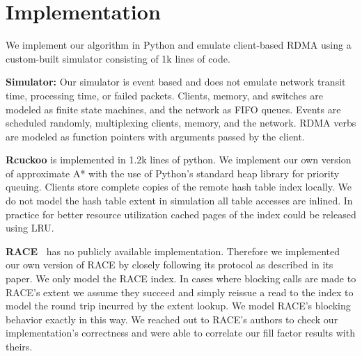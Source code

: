 \section{Implementation}

We implement our algorithm in
Python and emulate client-based RDMA using a custom-built
simulator consisting of 1k lines of code. 

\textbf{Simulator:} Our simulator is event based and does
not emulate network transit time, processing time, or failed
packets. Clients, memory, and switches are modeled as finite
state machines, and the network as FIFO queues. Events are
scheduled randomly, multiplexing clients, memory, and the
network. RDMA verbs are modeled as function pointers with
arguments passed by the client.

\textbf{Rcuckoo} is implemented in 1.2k lines of
python. We implement our own version of approximate A* with
the use of Python's standard heap library for priority
queuing. Clients store complete copies of the remote hash
table index locally. We do not model the hash table extent
in simulation all table accesses are inlined. In practice
for better resource utilization cached pages of the index
could be released using LRU. 

\textbf{RACE~\cite{race}} has no publicly available
implementation. Therefore we implemented our own version of
RACE by closely following its protocol as described in its
paper.  We only model the RACE index. In cases where
blocking calls are made to RACE's extent we assume they
succeed and simply reissue a read to the index to model the
round trip incurred by the extent lookup. We model RACE's
blocking behavior exactly in this way. We reached out to
RACE's authors to check our implementation's correctness and
were able to correlate our fill factor results with theirs.
